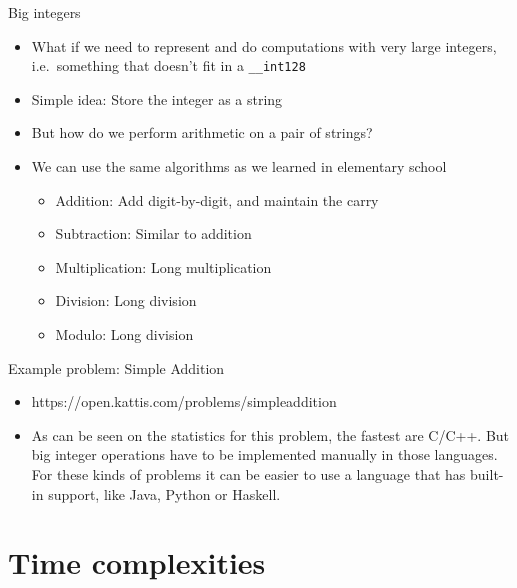 \documentclass{beamer}
\begin{document}
\begin{frame}[plain]{Big integers}
    \begin{itemize}
        \item What if we need to represent and do computations with very large integers, i.e.\ something that doesn't fit in a \texttt{\_\_int128}

        \vspace{5pt}
        \item Simple idea: Store the integer as a string
        \vspace{5pt}
        \item But how do we perform arithmetic on a pair of strings?
        \item We can use the same algorithms as we learned in elementary school
            \begin{itemize}
                \item Addition: Add digit-by-digit, and maintain the carry
                \item Subtraction: Similar to addition
                \item Multiplication: Long multiplication
                \item Division: Long division
                \item Modulo: Long division
            \end{itemize}
    \end{itemize}
\end{frame}

\begin{frame}[plain]{Example problem: Simple Addition}
    \begin{itemize}
        \item https://open.kattis.com/problems/simpleaddition
        \item As can be seen on the statistics for this problem, the fastest are C/C++. But big integer operations have to be implemented manually in those languages. For these kinds of problems it can be easier to use a language that has built-in support, like Java, Python or Haskell.
    \end{itemize}
\end{frame}

\section*{Time complexities}
\end{document}
